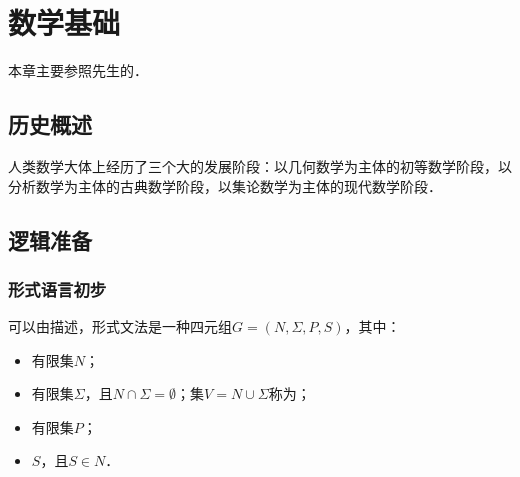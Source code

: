 \chapter{数学基础}

本章主要参照\citeauthor{WangFt2001}先生的\cite{WangFt2001}．

\section{历史概述}

人类数学大体上经历了三个大的发展阶段：以几何数学为主体的初等数学阶段，以分析数学为主体的古典数学阶段，以集论数学为主体的现代数学阶段．

\section{逻辑准备}

\subsection{形式语言初步}

可以由描述，形式文法是一种四元组$G=(N,\Sigma,P,S)$，其中：
\begin{itemize}
	\item {}有限集$N$；
	\item {}有限集$\Sigma$，且$N\cap\Sigma=\emptyset$；集$V=N\cup\Sigma$称为；
	\item {}有限集$P$；
	\item {}$S$，且$S\in{}N$．
\end{itemize}

